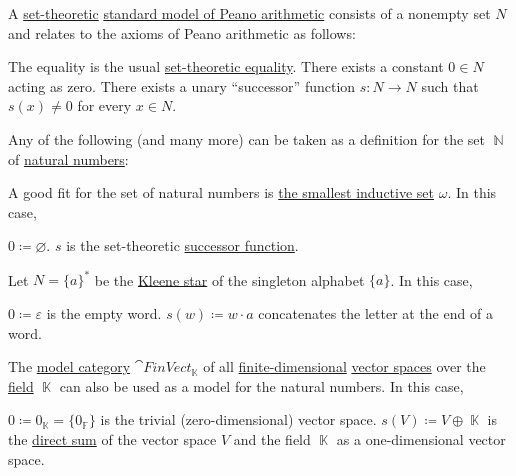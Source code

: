 \begin{example}\label{ex:natural_numbers_models}
  A \hyperref[sec:set_theory]{set-theoretic} \hyperref[def:peano_arithmetic]{standard model of Peano arithmetic} consists of a nonempty set \( N \) and relates to the axioms of Peano arithmetic as follows:
  \begin{reflist}
     The equality is the usual \hyperref[def:set_zfc]{set-theoretic equality}.
     There exists a constant \( 0 \in N \) acting as zero.
     There exists a unary \enquote{successor} function \( s: N \to N \) such that \( s(x) \neq 0 \) for every \( x \in N \).
  \end{reflist}

  Any of the following (and many more) can be taken as a definition for the set \( \BbbN \) of \hyperref[def:natural_numbers]{natural numbers}:
  \begin{thmenum}
     A good fit for the set of natural numbers is \hyperref[def:smallest_inductive_set]{the smallest inductive set} \( \omega \). In this case,
    \begin{reflist}
       \( 0 \coloneqq \varnothing \).
       \( s \) is the set-theoretic \hyperref[def:successor_operator]{successor function}.
    \end{reflist}

     Let \( N = \{ a \}^{*} \) be the \hyperref[def:language/kleene_star]{Kleene star} of the singleton alphabet \( \{ a \} \). In this case,
    \begin{reflist}
       \( 0 \coloneqq \varepsilon \) is the empty word.
       \( s(w) \coloneqq w \cdot a \) concatenates the letter at the end of a word.
    \end{reflist}

     The \hyperref[def:first_order_model_category]{model category} \( \cat{FinVect}_{\BbbK} \) of all \hyperref[def:vector_space_dimension]{finite-dimensional} \hyperref[def:vector_space]{vector spaces} over the \hyperref[def:field]{field} \( \BbbK \) can also be used as a model for the natural numbers. In this case,
    \begin{reflist}
       \( 0 \coloneqq 0_{\BbbK} = \{ 0_{\BbbF} \} \) is the trivial (zero-dimensional) vector space.
       \( s(V) \coloneqq V \oplus \BbbK \) is the \hyperref[def:left_module_direct_product]{direct sum} of the vector space \( V \) and the field \( \BbbK \) as a one-dimensional vector space.
    \end{reflist}
  \end{thmenum}
\end{example}

